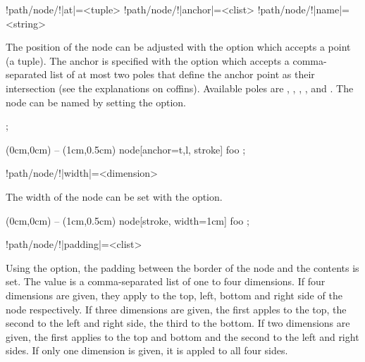 \documentclass[a4paper]{article}
\begin{document}
{{\begin{macrodef}
!path/node/!|at|={<tuple>}
!path/node/!|anchor|={<clist>}
!path/node/!|name|={<string>}
\end{macrodef}
The position of the node can be adjusted with the  option which accepts a point (a tuple). The anchor is specified with the  option which accepts a comma-separated list of at most two poles that define the anchor point as their intersection (see the explanations on coffins). Available poles are , , , ,  and . The node can be named by setting the  option.

\begin{codeexamplecolumns}
\begin{qdraw}
   ;
\end{qdraw}
\end{codeexamplecolumns}

\begin{codeexamplecolumns}
\begin{qdraw}
  \stroke (0cm,0cm) -- (1cm,0.5cm)
    node[anchor={t,l}, stroke] {foo} ;
\end{qdraw}
\end{codeexamplecolumns}

\begin{macrodef}
!path/node/!|width|={<dimension>}
\end{macrodef}
The width of the node can be set with the  option.

\begin{codeexamplecolumns}
\begin{qdraw}
  \stroke (0cm,0cm) -- (1cm,0.5cm)
    node[stroke, width={1cm}] {foo} ;
\end{qdraw}
\end{codeexamplecolumns}

\begin{macrodef}
!path/node/!|padding|={<clist>}
\end{macrodef}
Using the  option, the padding between the border of the node and the contents is set. The value is a comma-separated list of one to four dimensions. If four dimensions are given, they apply to the top, left, bottom and right side of the node respectively. If three dimensions are given, the first apples to the top, the second to the left and right side, the third to the bottom. If two dimensions are given, the first applies to the top and bottom and the second to the left and right sides. If only one dimension is given, it is appled to all four sides.

}}
\end{document}
